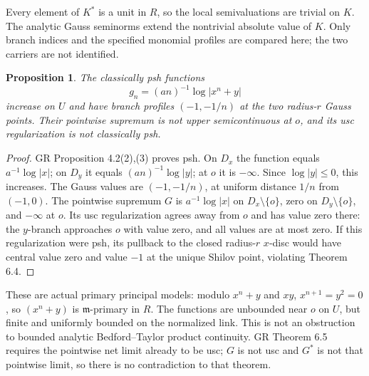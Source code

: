 \documentclass[11pt]{article}
\newtheorem{proposition}[theorem]{Proposition}
\theoremstyle{definition}
\begin{document}
Every element of $K^*$ is a unit in $R$, so the local semivaluations are
trivial on $K$. The analytic Gauss seminorms extend the nontrivial
absolute value of $K$. Only branch indices and the specified monomial
profiles are compared here; the two carriers are not identified.

\begin{proposition}\label{prop:node}
The classically psh functions
\[
 g_n=(an)^{-1}\log|x^n+y|
\]
increase on $U$ and have branch profiles $(-1,-1/n)$ at the two
radius-$r$ Gauss points. Their pointwise supremum is not upper
semicontinuous at $o$, and its usc regularization is not classically psh.
\end{proposition}
\begin{proof}
GR Proposition 4.2(2),(3) proves psh. On $D_x$ the function equals
$a^{-1}\log|x|$; on $D_y$ it equals $(an)^{-1}\log|y|$; at $o$ it is
$-\infty$. Since $\log|y|\leq0$, this increases. The Gauss values are
$(-1,-1/n)$, at uniform distance $1/n$ from $(-1,0)$.
The pointwise supremum $G$ is $a^{-1}\log|x|$ on $D_x\setminus\{o\}$,
zero on $D_y\setminus\{o\}$, and $-\infty$ at $o$. Its usc
regularization agrees away from $o$ and has value zero there: the
$y$-branch approaches $o$ with value zero, and all values are at most
zero. If this regularization were psh, its pullback to the closed
radius-$r$ $x$-disc would have central value zero and value $-1$ at
the unique Shilov point, violating Theorem 6.4.
\end{proof}

These are actual primary principal models: modulo $x^n+y$ and $xy$,
$x^{n+1}=y^2=0$, so $(x^n+y)$ is $\mathfrak m$-primary in $R$.
The functions are unbounded near $o$ on $U$, but finite and uniformly
bounded on the normalized link. This is not an obstruction to bounded
analytic Bedford--Taylor product continuity. GR Theorem 6.5 requires
the pointwise net limit already to be usc; $G$ is not usc and $G^*$ is
not that pointwise limit, so there is no contradiction to that theorem.
\end{document}

